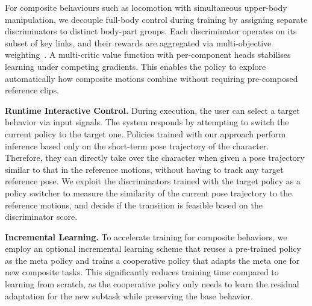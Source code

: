 For composite behaviours such as locomotion with simultaneous upper-body manipulation, we decouple full-body control during training by assigning separate discriminators to distinct body-part groups. Each discriminator operates on its subset of key links, and their rewards are aggregated via multi-objective weighting~\cite{composite2023}. A multi-critic value function with per-component heads stabilises learning under competing gradients. This enables the policy to explore automatically how composite motions combine without requiring pre-composed reference clips.

\textbf{Runtime Interactive Control.} During execution, the user can select a target behavior via input signals. The system responds by attempting to switch the current policy to the target one. Policies trained with our approach perform inference based only on the short-term pose trajectory of the character. Therefore, they can directly take over the character when given a pose trajectory similar to that in the reference motions, without having to track any target reference pose. We exploit the discriminators trained with the target policy as a policy switcher to measure the similarity of the current pose trajectory to the reference motions, and decide if the transition is feasible based on the discriminator score.

\textbf{Incremental Learning.} To accelerate training for composite behaviors, we employ an optional incremental learning scheme that reuses a pre-trained policy as the meta policy and trains a cooperative policy that adapts the meta one for new composite tasks. This significantly reduces training time compared to learning from scratch, as the cooperative policy only needs to learn the residual adaptation for the new subtask while preserving the base behavior.
